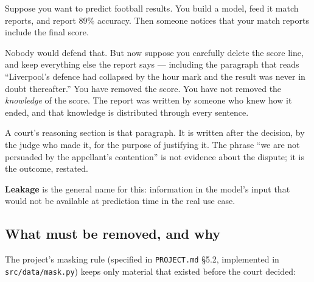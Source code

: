\documentclass[12pt,a4paper]{article}
\newcommand{\code}[1]{\texttt{\small #1}}
\begin{document}
Suppose you want to predict football results. You build a model, feed it match reports, and report
89\% accuracy. Then someone notices that your match reports include the final score.

Nobody would defend that. But now suppose you carefully delete the score line, and keep everything
else the report says --- including the paragraph that reads ``Liverpool's defence had collapsed by
the hour mark and the result was never in doubt thereafter.'' You have removed the score. You have
not removed the \emph{knowledge} of the score. The report was written by someone who knew how it
ended, and that knowledge is distributed through every sentence.

A court's reasoning section is that paragraph. It is written after the decision, by the judge who
made it, for the purpose of justifying it. The phrase ``we are not persuaded by the appellant's
contention'' is not evidence about the dispute; it is the outcome, restated.

\textbf{Leakage} is the general name for this: information in the model's input that would not be
available at prediction time in the real use case.

\subsection{What must be removed, and why}

The project's masking rule (specified in \code{PROJECT.md} §5.2, implemented in
\code{src/data/mask.py}) keeps only material that existed before the court decided:
\end{document}
